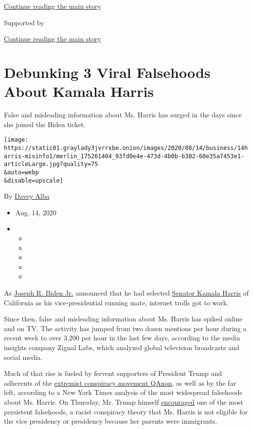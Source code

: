 \protect\hyperlink{after-top}{Continue reading the main story}

Supported by

\protect\hyperlink{after-sponsor}{Continue reading the main story}

\hypertarget{debunking-3-viral-falsehoods-about-kamala-harris}{%
\section{Debunking 3 Viral Falsehoods About Kamala
Harris}\label{debunking-3-viral-falsehoods-about-kamala-harris}}

False and misleading information about Ms. Harris has surged in the days
since she joined the Biden ticket.

\texttt{[image: https://static01.graylady3jvrrxbe.onion/images/2020/08/14/business/14harris-misinfo1/merlin\_175261404\_93fd0e4e-473d-4b0b-b302-60e35a7453e1-articleLarge.jpg?quality=75\\\&auto=webp\\\&disable=upscale]}

By \href{https://www.nytimes3xbfgragh.onion/by/davey-alba}{Davey Alba}

\begin{itemize}
\item
  Aug. 14, 2020
\item
  \begin{itemize}
  \item
  \item
  \item
  \item
  \item
  \end{itemize}
\end{itemize}

As
\href{https://www.nytimes3xbfgragh.onion/topic/person/joe-biden}{Joseph
R. Biden Jr.} announced that he had selected
\href{https://www.nytimes3xbfgragh.onion/interactive/2020/us/elections/kamala-harris.html}{Senator
Kamala Harris} of California as his vice-presidential running mate,
internet trolls got to work.

Since then, false and misleading information about Ms. Harris has spiked
online and on TV. The activity has jumped from two dozen mentions per
hour during a recent week to over 3,200 per hour in the last few days,
according to the media insights company Zignal Labs, which analyzed
global television broadcasts and social media.

Much of that rise is fueled by fervent supporters of President Trump and
adherents of the
\href{https://www.nytimes3xbfgragh.onion/2020/08/13/technology/qanon-tea-party.html}{extremist
conspiracy movement QAnon}, as well as by the far left, according to a
New York Times analysis of the most widespread falsehoods about Ms.
Harris. On Thursday, Mr. Trump himself
\href{https://www.nytimes3xbfgragh.onion/2020/08/13/us/politics/trump-kamala-harris.html}{encouraged}
one of the most persistent falsehoods, a racist conspiracy theory that
Ms. Harris is not eligible for the vice presidency or presidency because
her parents were immigrants.

